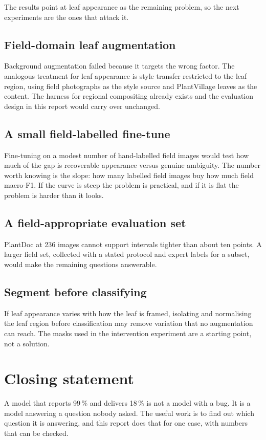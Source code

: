 The results point at leaf appearance as the remaining problem, so the next
experiments are the ones that attack it.

\subsection*{Field-domain leaf augmentation}

Background augmentation failed because it targets the wrong factor. The analogous
treatment for leaf appearance is style transfer restricted to the leaf region, using
field photographs as the style source and PlantVillage leaves as the content. The
harness for regional compositing already exists and the evaluation design in this
report would carry over unchanged.

\subsection*{A small field-labelled fine-tune}

Fine-tuning on a modest number of hand-labelled field images would test how much of
the gap is recoverable appearance versus genuine ambiguity. The number worth knowing
is the slope: how many labelled field images buy how much field macro-F1. If the
curve is steep the problem is practical, and if it is flat the problem is harder than
it looks.

\subsection*{A field-appropriate evaluation set}

PlantDoc at 236 images cannot support intervals tighter than about ten points. A
larger field set, collected with a stated protocol and expert labels for a subset,
would make the remaining questions answerable.

\subsection*{Segment before classifying}

If leaf appearance varies with how the leaf is framed, isolating and normalising the
leaf region before classification may remove variation that no augmentation can
reach. The masks used in the intervention experiment are a starting point, not a
solution.

\section{Closing statement}

A model that reports 99\,\% and delivers 18\,\% is not a model with a bug. It is a
model answering a question nobody asked. The useful work is to find out which
question it is answering, and this report does that for one case, with numbers that
can be checked.
